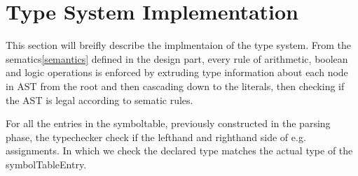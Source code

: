 \section{Type System Implementation}\label{TypSysImp}

This section will breifly describe the implmentaion of the type system. From the sematics\cref{semantics} defined in the design part, every rule of arithmetic, boolean and logic operations is enforced by extruding type information about each node in AST from the root and then cascading down to the literals, then checking if the AST is legal according to sematic rules.

For all the entries in the symboltable, previously constructed in the parsing phase, the typechecker check if the lefthand and righthand side of e.g. assignments. In which we check the declared type matches the actual type of the symbolTableEntry.
